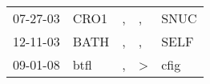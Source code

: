 \begin{supertabular}{p{0.07\textwidth}p{0.06\textwidth}p{0.02\textwidth}p{0.02\textwidth}p{0.06\textwidth}}
 07-27-03\textsuperscript{} &  CRO1\textsuperscript{} &  , &             , &  SNUC\textsuperscript{} \\
 12-11-03\textsuperscript{} &  BATH\textsuperscript{} &  , &             , &  SELF\textsuperscript{} \\
 09-01-08\textsuperscript{} &  btfl\textsuperscript{} &  , &  \textgreater &  cfig\textsuperscript{} \\
\end{supertabular}
